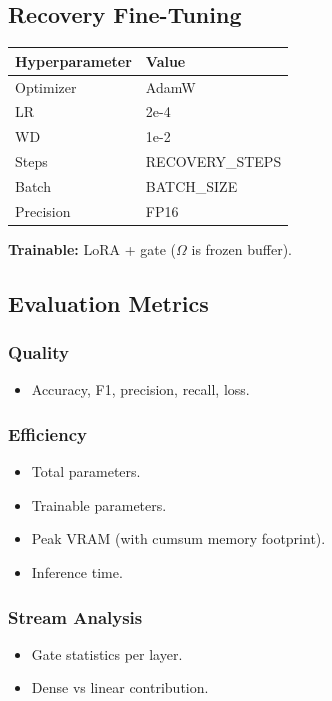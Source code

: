 \subsection{Recovery Fine-Tuning}

\begin{table}[H]
\centering
\small
\begin{tabular}{ll}
\toprule
\textbf{Hyperparameter} & \textbf{Value} \\
\midrule
Optimizer & AdamW \\
LR & 2e-4 \\
WD & 1e-2 \\
Steps & {{RECOVERY\_STEPS}} \\
Batch & {{BATCH\_SIZE}} \\
Precision & FP16 \\
\bottomrule
\end{tabular}
\end{table}

\textbf{Trainable:} LoRA + gate ($\Omega$ is frozen buffer).

\subsection{Evaluation Metrics}

\subsubsection{Quality}
\begin{itemize}
\item Accuracy, F1, precision, recall, loss.

\end{itemize}
\subsubsection{Efficiency}
\begin{itemize}
\item Total parameters.
\item Trainable parameters.
\item Peak VRAM (with cumsum memory footprint).
\item Inference time.

\end{itemize}
\subsubsection{Stream Analysis}
\begin{itemize}
\item Gate statistics per layer.
\item Dense vs linear contribution.

\end{itemize}
